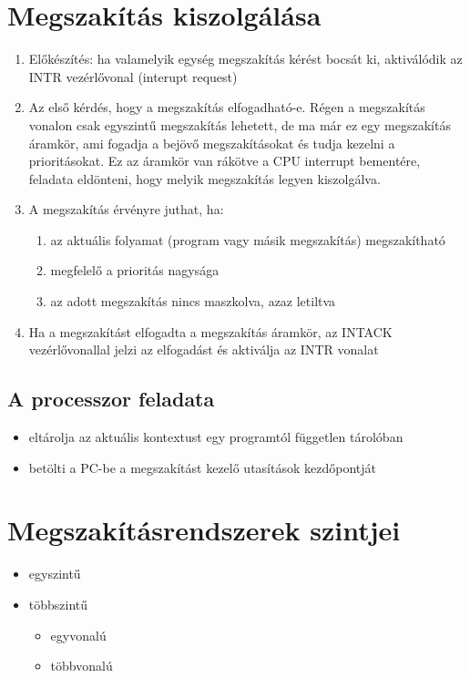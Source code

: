 \section{Megszakítás kiszolgálása}
\begin{enumerate}
    \item Előkészítés: ha valamelyik egység megszakítás kérést bocsát ki, aktiválódik az INTR vezérlővonal (interupt request)
    \item Az első kérdés, hogy a megszakítás elfogadható-e. Régen a megszakítás vonalon csak egyszintű megszakítás lehetett, de ma már ez egy megszakítás áramkör, ami fogadja a bejövő megszakításokat és tudja kezelni a prioritásokat. Ez az áramkör van rákötve a CPU interrupt bementére, feladata eldönteni, hogy melyik megszakítás legyen kiszolgálva.
    \item A megszakítás érvényre juthat, ha:
    \begin{enumerate}
        \item az aktuális folyamat (program vagy másik megszakítás) megszakítható
        \item megfelelő a prioritás nagysága
        \item az adott megszakítás nincs maszkolva, azaz letiltva
    \end{enumerate}
    \item Ha a megszakítást elfogadta a megszakítás áramkör, az INTACK vezérlővonallal jelzi az elfogadást és aktiválja az INTR vonalat
\end{enumerate}

\subsection{A processzor feladata}
\begin{itemize}
    \item eltárolja az aktuális kontextust egy programtól független tárolóban
    \item betölti a PC-be a megszakítást kezelő utasítások kezdőpontját
\end{itemize}

\section{Megszakításrendszerek szintjei}
\begin{itemize}
    \item egyszintű
    \item többszintű
    \begin{itemize}
        \item egyvonalú
        \item többvonalú
    \end{itemize}
\end{itemize}

